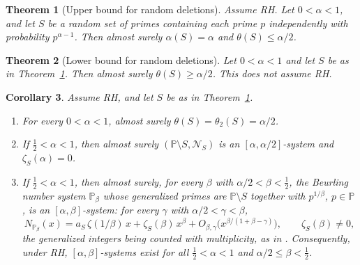 \documentclass[11pt]{amsart}
\newtheorem{theorem}{Theorem}
\newtheorem{corollary}[theorem]{Corollary}
\theoremstyle{remark}
\numberwithin{equation}{section}
\newcommand{\PP}{\mathbb{P}}
\newcommand{\cN}{\mathcal{N}}
\begin{document}
\begin{theorem}[Upper bound for random deletions]\label{thm:upper}
Assume RH. Let $0<\alpha<1$, and let $S$ be a random set of primes containing each prime $p$ independently with probability $p^{\alpha-1}$. Then almost surely $\alpha(S)=\alpha$ and $\theta(S)\le\alpha/2$.
\end{theorem}

\begin{theorem}[Lower bound for random deletions]\label{thm:lower}
Let $0<\alpha<1$ and let $S$ be as in Theorem~\ref{thm:upper}. Then almost surely $\theta(S)\ge\alpha/2$. This does not assume RH.
\end{theorem}

\begin{corollary}\label{cor:systems}
Assume RH, and let $S$ be as in Theorem~\ref{thm:upper}.
\begin{enumerate}
\item For every $0<\alpha<1$, almost surely $\theta(S)=\theta_2(S)=\alpha/2$.
\item If $\tfrac12<\alpha<1$, then almost surely $(\PP\setminus S,\cN_S)$ is an $[\alpha,\alpha/2]$-system and $\zeta_S(\alpha)=0$.
\item If $\tfrac12<\alpha<1$, then almost surely, for every $\beta$ with $\alpha/2<\beta<\tfrac12$, the Beurling number system $\PP_\beta$ whose generalized primes are $\PP\setminus S$ together with $p^{1/\beta}$, $p\in\PP$, is an $[\alpha,\beta]$-system: for every $\gamma$ with $\alpha/2<\gamma<\beta$,
\[
N_{\PP_\beta}(x)=a_S\,\zeta(1/\beta)\,x+\zeta_S(\beta)\,x^{\beta}+O_{\beta,\gamma}\bigl(x^{\beta/(1+\beta-\gamma)}\bigr),\qquad \zeta_S(\beta)\ne0,
\]
the generalized integers being counted with multiplicity, as in \cite{BDR}. Consequently, under RH, $[\alpha,\beta]$-systems exist for all $\tfrac12<\alpha<1$ and $\alpha/2\le\beta<\tfrac12$.
\end{enumerate}
\end{corollary}
\end{document}
